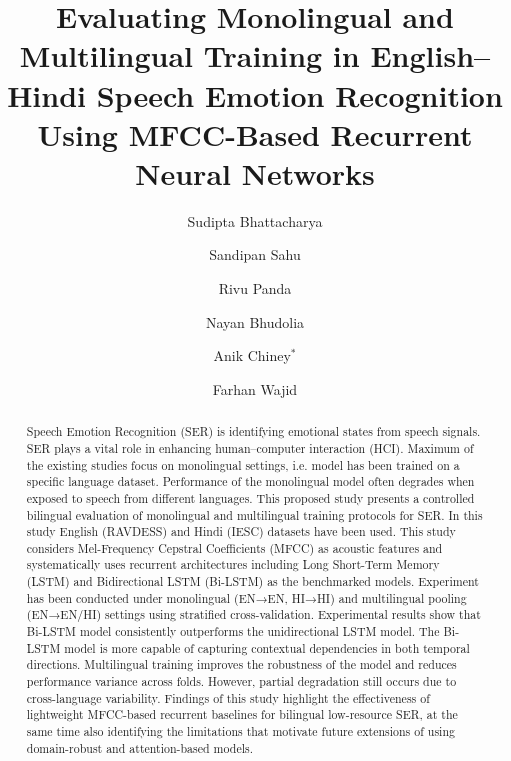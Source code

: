 \documentclass[runningheads]{llncs}
\begin{document}
\title{Evaluating Monolingual and Multilingual Training in English–Hindi Speech Emotion Recognition Using MFCC-Based Recurrent Neural Networks}


\author{
Sudipta Bhattacharya \and
Sandipan Sahu \and
Rivu Panda \and
Nayan Bhudolia \and
Anik Chiney$^{*}$ \and
Farhan Wajid
}



\maketitle

\begin{abstract}
Speech Emotion Recognition (SER) is identifying emotional states from speech signals. SER plays a vital role in enhancing human–computer interaction (HCI). Maximum of the existing studies focus on monolingual settings, i.e. model has been trained on a specific language dataset. Performance of the monolingual model often degrades when exposed to speech from different languages. This proposed study presents a controlled bilingual evaluation of monolingual and multilingual training protocols for SER. In this study English (RAVDESS) and Hindi (IESC) datasets have been used. This study considers Mel-Frequency Cepstral Coefficients (MFCC) as acoustic features and systematically uses recurrent architectures including Long Short-Term Memory (LSTM) and Bidirectional LSTM (Bi-LSTM) as the benchmarked models. Experiment has been conducted under monolingual (EN→EN, HI→HI) and multilingual pooling (EN→EN/HI) settings using stratified cross-validation. Experimental results show that Bi-LSTM model consistently outperforms the unidirectional LSTM model. The Bi-LSTM model is more capable of capturing contextual dependencies in both temporal directions. Multilingual training improves the robustness of the model and reduces performance variance across folds. However, partial degradation still occurs due to cross-language variability. Findings of this study highlight the effectiveness of lightweight MFCC-based recurrent baselines for bilingual low-resource SER, at the same time also identifying the limitations that motivate future extensions of using domain-robust and attention-based models.
\end{abstract}
\end{document}
